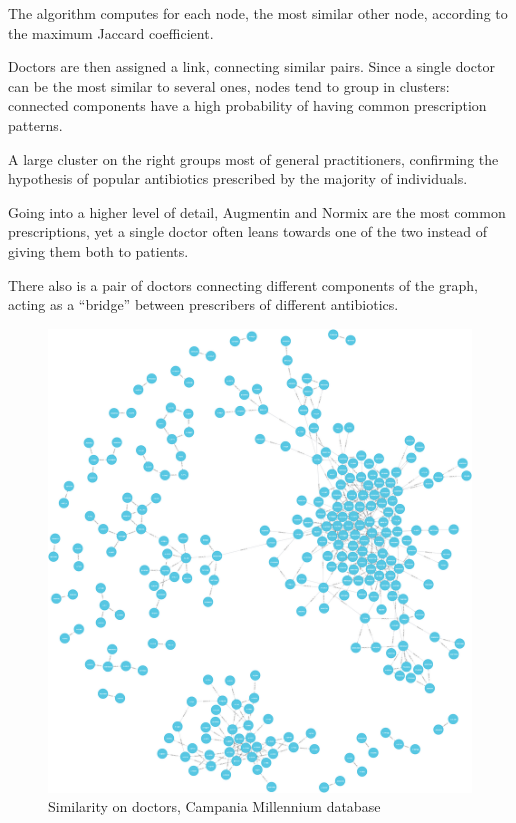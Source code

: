 The algorithm computes for each node, the most similar other node, according to the maximum Jaccard coefficient.

Doctors are then assigned a link, connecting similar pairs. Since a single doctor can be the most similar to several ones, nodes tend to group in clusters: connected components have a high probability of having common prescription patterns. 

A large cluster on the right groups most of general practitioners, confirming the hypothesis of popular antibiotics prescribed by the majority of individuals.

Going into a higher level of detail, Augmentin and Normix are the most common prescriptions, yet a single doctor often leans towards one of the two instead of giving them both to patients. 

There also is a pair of doctors connecting different components of the graph, acting as a ``bridge'' between prescribers of different antibiotics.\\

\begin{figure}[h]
	\centering
	\includegraphics[scale=0.15]{./images/similarity-doctors.png}
	\caption{\small Similarity on doctors, Campania Millennium database}
\end{figure}

